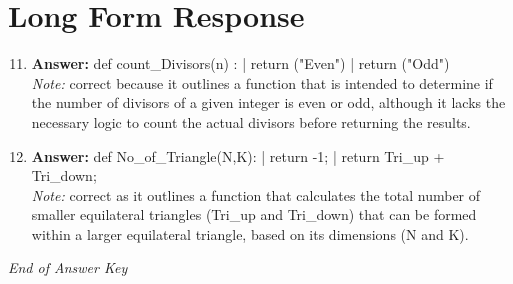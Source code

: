 \documentclass[12pt]{article}
\begin{document}
\section*{Long Form Response}
\begin{enumerate}[label=\arabic*.]
\setcounter{enumi}{10}
\item \textbf{Answer:} def count\_Divisors(n) : | return ("Even") | return ("Odd")
\\ \textit{Note:} correct because it outlines a function that is intended to determine if the number of divisors of a given integer is even or odd, although it lacks the necessary logic to count the actual divisors before returning the results.
\item \textbf{Answer:} def No\_of\_Triangle(N,K): | return -1; | return Tri\_up + Tri\_down;
\\ \textit{Note:} correct as it outlines a function that calculates the total number of smaller equilateral triangles (Tri\_up and Tri\_down) that can be formed within a larger equilateral triangle, based on its dimensions (N and K).
\end{enumerate}

\vfill
\noindent\textit{End of Answer Key}
\end{document}
